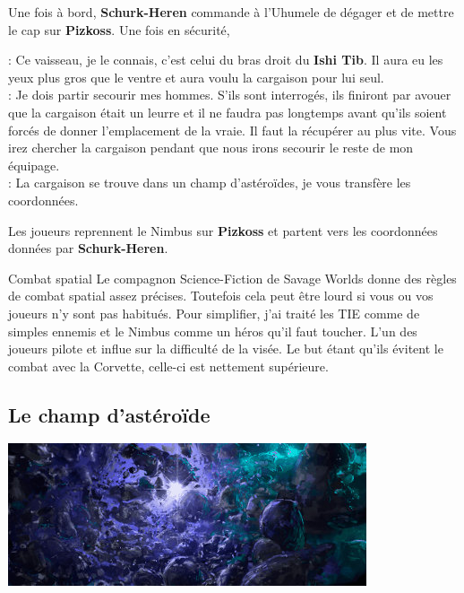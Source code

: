Une fois à bord, \textbf{Schurk-Heren} commande à l’Uhumele de dégager et de mettre le cap sur \textbf{Pizkoss}. Une fois en sécurité, 
\begin{quotebox}
    : Ce vaisseau, je le connais, c’est celui du bras droit du \textbf{Ishi Tib}. Il aura eu les yeux plus gros que le ventre et aura voulu la cargaison pour lui seul.\\
    : Je dois partir secourir mes hommes. S’ils sont interrogés, ils finiront par avouer que la cargaison était un leurre et il ne faudra pas longtemps avant qu’ils soient forcés de donner l’emplacement de la vraie. Il faut la récupérer au plus vite. Vous irez chercher la cargaison pendant que nous irons secourir le reste de mon équipage.\\
    : La cargaison se trouve dans un champ d’astéroïdes, je vous transfère les coordonnées.
\end{quotebox}

Les joueurs reprennent le Nimbus sur \textbf{Pizkoss} et partent vers les coordonnées données par \textbf{Schurk-Heren}.

\begin{paperbox}{Combat spatial}
Le compagnon Science-Fiction de Savage Worlds donne des règles de combat spatial assez précises. Toutefois cela peut être lourd si vous ou vos joueurs n’y sont pas habitués. Pour simplifier, j’ai traité les TIE comme de simples ennemis et le Nimbus comme un héros qu’il faut toucher. L’un des joueurs pilote et influe sur la difficulté de la visée.
Le but étant qu’ils évitent le combat avec la Corvette, celle-ci est nettement supérieure.
\end{paperbox}

\subsection{Le champ d’astéroïde}
\noindent\includegraphics[width=\linewidth]{_img/places/asteroid-field.jpg}\\

